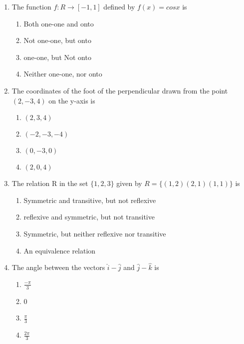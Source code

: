 \documentclass[journal,12pt,twocolumn]{IEEEtran}
\renewcommand\thesection{\arabic{section}}
\begin{document}
\begin{enumerate}[label=\thesection.\arabic*.,ref=\thesection.\theenumi]
\item The function  $ f : R \rightarrow \left[-1,1 \right] $ defined by $ f\left(x \right) = cosx $ is

\begin{enumerate}
    \item Both one-one and onto
    \item Not one-one, but onto
    \item one-one, but Not onto
    \item Neither one-one, nor onto
\end{enumerate}

\item  The coordinates of the foot of the perpendicular drawn from the point $ \left(2,-3,4 \right) $ on the y-axis is 

\begin{enumerate}
    \item $\left(2,3,4\right)$
    \item $\left(-2,-3,-4\right)$
    \item $\left(0,-3,0\right)$
    \item $\left(2,0,4\right)$
\end{enumerate}

\item  The relation R in the set $ \{1,2,3\}$  given by $R=\{(1,2)(2,1)(1,1)\}$ is

\begin{enumerate}
    \item Symmetric and transitive, but not reflexive  \\
    \item reflexive and symmetric, but not transitive  \\
    \item Symmetric, but neither reflexive nor transitive \\
    \item An equivalence relation 
\end{enumerate}
\item  The angle between the vectors $ \hat{i} - \hat{j} $ and $ \hat{j} - \hat{k} $ is

\begin{enumerate}
    \item $\frac{-\pi}{3}$
    \item 0
    \item $\frac{\pi}{3}$
    \item $\frac{2\pi}{3}$
\end{enumerate}


\end{enumerate}
\end{document}
